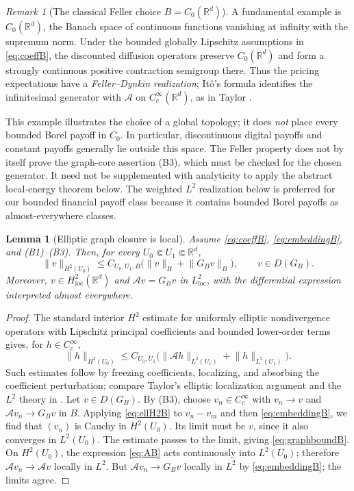 \documentclass[11pt,a4paper]{article}
\newtheorem{lemma}[theorem]{Lemma}
\theoremstyle{definition}\newtheorem{definition}{Definition}[section]\newtheorem{example}[theorem]{Example}
\theoremstyle{remark}\newtheorem{remark}[theorem]{Remark}\newtheorem{remarkSix}{Remark}[section]
\newcommand{\Rd}{\mathbb R^d}
\newcommand{\Cc}{C_c^\infty}
\newcommand{\loc}{\mathrm{loc}}
\newcommand{\norm}[1]{\lVert #1\rVert}
\newcommand{\cA}{\mathcal A}
\begin{document}
\begin{remark}[The classical Feller choice $B=C_0(\Rd)$]\label{rem:fellerB}
A fundamental example is $C_0(\Rd)$, the Banach space of continuous functions vanishing at infinity with the supremum norm.  Under the bounded globally Lipschitz assumptions in \eqref{eq:coeffB}, the discounted diffusion operators preserve $C_0(\Rd)$ and form a strongly continuous positive contraction semigroup there.  Thus the pricing expectations have a \emph{Feller--Dynkin realization}; It\^o's formula identifies the infinitesimal generator with $\cA$ on $C_c^\infty(\Rd)$, as in Taylor \cite[Vol.~II, Ch.~11, \S10, Prop.~10.1 and (10.23)--(10.32)]{taylorII}.

This example illustrates the choice of a global topology; it does \emph{not} place every bounded Borel payoff in $C_0$.  In particular, discontinuous digital payoffs and constant payoffs generally lie outside this space.  The Feller property does not by itself prove the graph-core assertion (B3), which must be checked for the chosen generator. It need not be supplemented with analyticity to apply the abstract local-energy theorem below.  The weighted $L^2$ realization below is preferred for our bounded financial payoff class because it contains bounded Borel payoffs as almost-everywhere classes.
\end{remark}


\begin{lemma}[Elliptic graph closure is local]\label{lem:graphB}
Assume \eqref{eq:coeffB}, \eqref{eq:embeddingB}, and (B1)--(B3). Then, for every $U_0\Subset U_1\Subset\Rd$,
\begin{equation}\label{eq:graphboundB}
\boxed{\quad\norm v_{H^2(U_0)}\le C_{U_0,U_1,B}
\bigl(\norm v_B+\norm{G_Bv}_B\bigr),\qquad v\in D(G_B).\quad}
\end{equation}
Moreover, $v\in H^2_{\loc}(\Rd)$ and $\cA v=G_Bv$ in $L^2_{\loc}$, with the differential expression interpreted almost everywhere.
\end{lemma}
\begin{proof}
The standard interior $H^2$ estimate for uniformly elliptic nondivergence operators with Lipschitz principal coefficients and bounded lower-order terms gives, for $h\in\Cc$,
\begin{equation}\label{eq:ellH2B}
 \norm h_{H^2(U_0)}\le C_{U_0,U_1}
 \bigl(\norm{\cA h}_{L^2(U_1)}+\norm h_{L^2(U_1)}\bigr).
\end{equation}
Such estimates follow by freezing coefficients, localizing, and absorbing the coefficient perturbation; compare Taylor's elliptic localization argument \cite[Vol.~I, Ch.~5, \S11]{taylorI} and the $L^2$ theory in \cite[Ch.~9]{gilbarg}.
Let $v\in D(G_B)$. By (B3), choose $v_n\in\Cc$ with $v_n\to v$ and $\cA v_n\to G_Bv$ in $B$. Applying \eqref{eq:ellH2B} to $v_n-v_m$ and then \eqref{eq:embeddingB}, we find that $(v_n)$ is Cauchy in $H^2(U_0)$. Its limit must be $v$, since it also converges in $L^2(U_0)$. The estimate passes to the limit, giving \eqref{eq:graphboundB}. On $H^2(U_0)$, the expression \eqref{eq:AB} acts continuously into $L^2(U_0)$; therefore $\cA v_n\to\cA v$ locally in $L^2$. But $\cA v_n\to G_Bv$ locally in $L^2$ by \eqref{eq:embeddingB}; the limits agree.
\end{proof}
\end{document}
